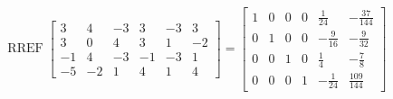 \begin{exerciseAnswer} 


\[\operatorname{RREF} \left[\begin{array}{cccccc}
3 & 4 & -3 & 3 & -3 & 3 \\
3 & 0 & 4 & 3 & 1 & -2 \\
-1 & 4 & -3 & -1 & -3 & 1 \\
-5 & -2 & 1 & 4 & 1 & 4
\end{array}\right] = \left[\begin{array}{cccccc}
1 & 0 & 0 & 0 & \frac{1}{24} & -\frac{37}{144} \\
0 & 1 & 0 & 0 & -\frac{9}{16} & -\frac{9}{32} \\
0 & 0 & 1 & 0 & \frac{1}{4} & -\frac{7}{8} \\
0 & 0 & 0 & 1 & -\frac{1}{24} & \frac{109}{144}
\end{array}\right] \]



\end{exerciseAnswer}
